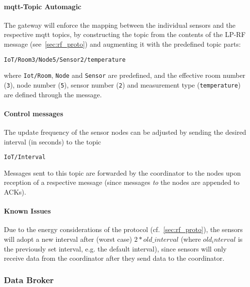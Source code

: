 \paragraph{\Gls{mqtt}-Topic Automagic}
The gateway will enforce the mapping between the individual sensors and the respective \gls{mqtt} topics, by constructing the topic from the contents of the LP-RF message (see~\cref{sec:rf_proto}) and augmenting it with the predefined topic parts:
\begin{lstlisting}[]
IoT/Room3/Node5/Sensor2/temperature
\end{lstlisting}
where \lstinline{Iot/Room}, \lstinline{Node} and \lstinline{Sensor} are predefined, and the effective room number (\lstinline{3}), node number (\lstinline{5}), sensor number (\lstinline{2}) and measurement type (\lstinline{temperature}) are defined through the message.

\paragraph{Control messages}

The update frequency of the sensor nodes can be adjusted by sending the desired interval (in seconds) to the topic

\begin{lstlisting}[]
IoT/Interval
\end{lstlisting}

Messages sent to this topic are forwarded by the coordinator to the nodes upon reception of a respective message (since messages \emph{to} the nodes are appended to ACKs).

\paragraph{Known Issues}
\begin{compactitem}
  \item Due to the energy considerations of the protocol (cf.~\cref{sec:rf_proto}), the sensors will adopt a new interval after (worst case) $2*old\_interval$ (where $old_interval$ is the previously set interval, e.g. the default interval), since sensors will only receive data from the coordinator after they send data to the coordinator. 
\end{compactitem}


\subsubsection{Data Broker}
\label{sec:broker}

